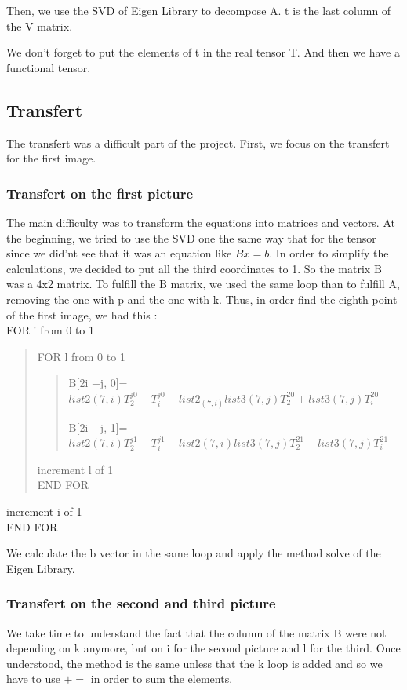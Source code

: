 \documentclass{report}
\begin{document}
Then, we use the SVD of Eigen Library to decompose A. t is the last column of the V matrix. 

We don't forget to put the elements of t in the real tensor T. And then we have a functional tensor. 

\subsection{Transfert}
The transfert was a difficult part of the project. First, we focus on the transfert for the first image. 
\subsubsection{Transfert on the first picture}
The main difficulty was to transform the equations into matrices and vectors. At the beginning, we tried to use the SVD one the same way that for the tensor since we did'nt see that it was an equation like $Bx = b$.
In order to simplify the calculations, we decided to put all the third coordinates to 1. So the matrix B was a 4x2 matrix. To fulfill the B matrix, we used the same loop than to fulfill A, removing the one with p and the one with k. 
Thus, in order find the eighth point of the first image, we had this :
\\FOR i from 0 to 1
		\begin{verse}
		FOR l from 0 to 1
\begin{verse}
\begin{list}{•}{•}
\item 
B[2i +j, 0]= $list2(7,i)T_{2}^{j0} - T_{i}^{j0} - list2_(7,i)list3(7,j)T_{2}^{20} + list3(7,j)T_{i}^{20}$
\item 
B[2i +j, 1]= $list2(7,i)T_{2}^{j1} - T_{i}^{j1} - list2(7,i)list3(7,j)T_{2}^{21} + list3(7,j)T_{i}^{21}$
\end{list}


\end{verse}
				increment l of 1			
		\\END FOR
		\end{verse}	
		increment i of 1
	\\END FOR

We calculate the b vector in the same loop and apply the method solve of the Eigen Library. 

\subsubsection{Transfert on the second and third picture}
We take time to understand the fact that the column of the matrix B were not depending on k anymore, but on i for the second picture and l for the third. Once understood, the method is the same unless that the k loop is added and so we have to use $+=$ in order to sum the elements. 
\end{document}
